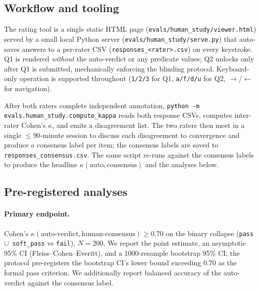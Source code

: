 \subsection{Workflow and tooling}
\label{app:human_study:tooling}

The rating tool is a single static HTML page (\texttt{evals/human\_study/viewer.html}) served by a small local Python server (\texttt{evals/human\_study/serve.py}) that auto-saves answers to a per-rater CSV (\texttt{responses\_<rater>.csv}) on every keystroke.
Q1 is rendered \emph{without} the auto-verdict or any predicate values; Q2 unlocks only after Q1 is submitted, mechanically enforcing the blinding protocol.
Keyboard-only operation is supported throughout (\texttt{1/2/3} for Q1, \texttt{a/f/d/u} for Q2, $\rightarrow / \leftarrow$ for navigation).

After both raters complete independent annotation, \texttt{python -m evals.human\_study.compute\_kappa} reads both response CSVs, computes inter-rater Cohen's $\kappa$, and emits a disagreement list.
The two raters then meet in a single $\leq 90$-minute session to discuss each disagreement to convergence and produce a consensus label per item; the consensus labels are saved to \texttt{responses\_consensus.csv}.
The same script re-runs against the consensus labels to produce the headline $\kappa(\text{auto},\text{consensus})$ and the analyses below.

\subsection{Pre-registered analyses}
\label{app:human_study:analyses}

\paragraph{Primary endpoint.}
Cohen's $\kappa(\text{auto-verdict}, \text{human-consensus}) \geq 0.70$ on the binary collapse (\texttt{pass}~$\cup$~\texttt{soft\_pass} vs \texttt{fail}), $N = 200$.
We report the point estimate, an asymptotic 95\% CI (Fleiss--Cohen--Everitt), and a 1000-resample bootstrap 95\% CI; the protocol pre-registers the bootstrap CI's lower bound exceeding $0.70$ as the formal pass criterion.
We additionally report balanced accuracy of the auto-verdict against the consensus label.

